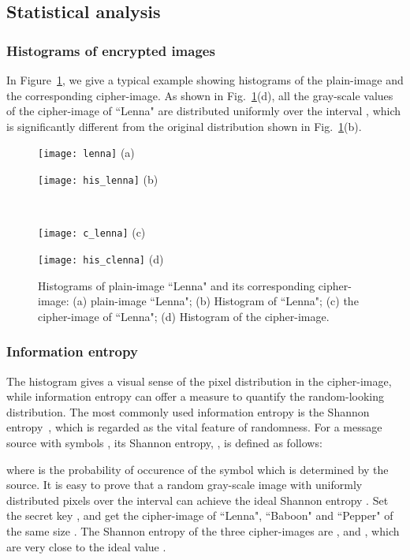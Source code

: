 \documentclass[3p,preprint,11pt]{elsarticle}
\newlength\figwidth
\newlength\imagewidth
\begin{document}
\subsection{Statistical analysis}
\subsubsection{Histograms of encrypted images}
In Figure~\ref{figure:histograms}, we give a typical example showing histograms of the plain-image and
the corresponding cipher-image. As shown in Fig.~\ref{figure:histograms}(d), all the gray-scale values
of the cipher-image of ``Lenna" are distributed uniformly over the interval , which is significantly
different from the original distribution shown in Fig.~\ref{figure:histograms}(b).
\begin{figure}[!htb]
\centering
\begin{minipage}{\figwidth}
\texttt{[image: lenna]}
\center (a)
\end{minipage}
\begin{minipage}{\imagewidth}
\texttt{[image: his\_lenna]}
\center (b)
\end{minipage}\\
\begin{minipage}{\figwidth}
\texttt{[image: c\_lenna]}
\center (c)
\end{minipage}
\begin{minipage}{\imagewidth}
\texttt{[image: his\_clenna]}
\center (d)
\end{minipage}
\caption{Histograms of plain-image ``Lenna" and its corresponding cipher-image:
(a) plain-image ``Lenna";
(b) Histogram of ``Lenna";
(c) the cipher-image of ``Lenna";
(d) Histogram of the cipher-image.}
\label{figure:histograms}
\end{figure}

\subsubsection{Information entropy}
The histogram gives a visual sense of the pixel distribution in the cipher-image, while information entropy
can offer a measure to quantify the random-looking distribution. The most commonly used information entropy is
the Shannon entropy~\cite{Shannon:Entropy:BSTJ49}, which is regarded as the vital feature of randomness.
For a message source with  symbols , its Shannon entropy, , is defined as follows:

where  is the probability of occurence of the symbol  which is determined by the source. It is easy to prove
that a random gray-scale image with uniformly distributed pixels over the
interval  can achieve the ideal Shannon entropy . Set the secret key ,
and get the cipher-image of ``Lenna", ``Baboon" and ``Pepper" of the same size .
The Shannon entropy of the three cipher-images are , 
and , which are very close to the ideal value .
\end{document}
